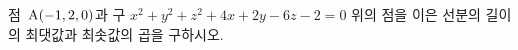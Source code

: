점~$\mathrm{A}(-1{,}\mkern3mu\mathopen{}2{,}\mkern3mu\mathopen{}0)$과 구 $x^2+y^2+z^2+4x+2y-6z-2=0$ 위의 점을 이은 선분의 길이의 최댓값과 최솟값의 곱을 구하시오.
